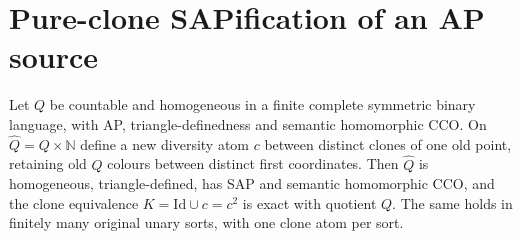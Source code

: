 \section{Pure-clone SAPification of an AP source}\label{sec:internal-clone-sap}
\begin{theorem}\label{thm:internal-clone-sap}
Let $Q$ be countable and homogeneous in a finite complete symmetric binary
language, with AP, triangle-definedness and semantic homomorphic CCO.
On $\widehat Q=Q\times\mathbb N$ define a new diversity atom $c$
between distinct clones of one old point, retaining old $Q$ colours between
distinct first coordinates. Then $\widehat Q$ is homogeneous,
triangle-defined, has SAP and semantic homomorphic CCO, and the clone
equivalence $K=\mathrm{Id}\cup c=c^2$ is exact with quotient $Q$.
The same holds in finitely many original unary sorts, with one clone atom
per sort.
\end{theorem}
